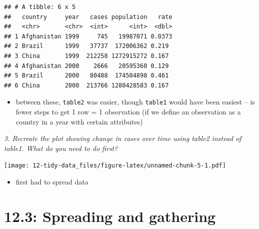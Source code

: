 \documentclass[]{book}
\newenvironment{Shaded}{\begin{snugshade}}{\end{snugshade}}
\newcommand{\DataTypeTok}[1]{\textcolor[rgb]{0.13,0.29,0.53}{#1}}
\newcommand{\KeywordTok}[1]{\textcolor[rgb]{0.13,0.29,0.53}{\textbf{#1}}}
\newcommand{\NormalTok}[1]{#1}
\newcommand{\OperatorTok}[1]{\textcolor[rgb]{0.81,0.36,0.00}{\textbf{#1}}}
\newcommand{\StringTok}[1]{\textcolor[rgb]{0.31,0.60,0.02}{#1}}
\providecommand{\tightlist}{%
  \setlength{\itemsep}{0pt}\setlength{\parskip}{0pt}}
\theoremstyle{definition}
\theoremstyle{definition}
\theoremstyle{definition}
\theoremstyle{remark}
\begin{document}
\begin{verbatim}
## # A tibble: 6 x 5
##   country     year   cases population   rate
##   <chr>       <chr>  <int>      <int>  <dbl>
## 1 Afghanistan 1999     745   19987071 0.0373
## 2 Brazil      1999   37737  172006362 0.219 
## 3 China       1999  212258 1272915272 0.167 
## 4 Afghanistan 2000    2666   20595360 0.129 
## 5 Brazil      2000   80488  174504898 0.461 
## 6 China       2000  213766 1280428583 0.167
\end{verbatim}

\begin{itemize}
\tightlist
\item
  between these, \texttt{table2} was easier, though \texttt{table1}
  would have been easiest -- is fewer steps to get 1 row = 1 observation
  (if we define an observation as a country in a year with certain
  attributes)
\end{itemize}

\emph{3. Recreate the plot showing change in cases over time using
table2 instead of table1. What do you need to do first?}

\begin{Shaded}
\end{Shaded}

\texttt{[image: 12-tidy-data\_files/figure-latex/unnamed-chunk-5-1.pdf]}

\begin{itemize}
\tightlist
\item
  first had to spread data
\end{itemize}

\hypertarget{spreading-and-gathering}{%
\section{12.3: Spreading and gathering}\label{spreading-and-gathering}}
\end{document}
